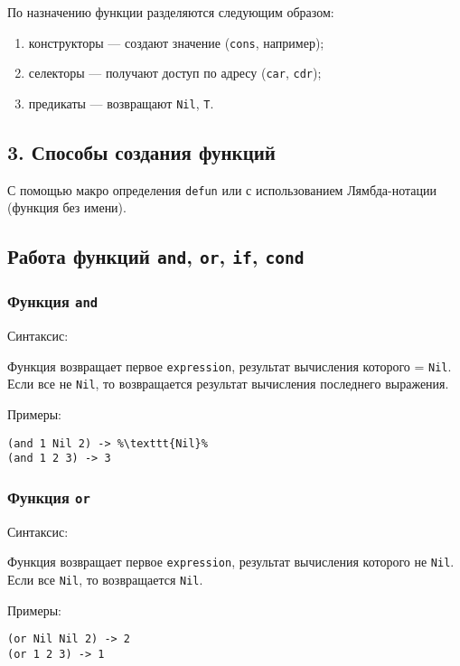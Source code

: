 По назначению функции разделяются следующим образом:
\begin{enumerate}
	\item конструкторы --- создают значение (\texttt{cons}, например);
	\item селекторы --- получают доступ по адресу (\texttt{car}, \texttt{cdr});
	\item предикаты --- возвращают \texttt{Nil}, \texttt{T}.
\end{enumerate}

\subsection*{3. Способы создания функций}

С помощью макро определения \texttt{defun} или с использованием Лямбда-нотации (функция без имени).

\subsection*{Работа функций \texttt{and}, \texttt{or}, \texttt{if}, \texttt{cond}}

\subsubsection*{Функция \texttt{and}}

Синтаксис: 

Функция возвращает первое \texttt{expression}, результат вычисления которого = \texttt{Nil}. Если все не \texttt{Nil}, то возвращается результат вычисления последнего выражения.

Примеры:
\begin{lstlisting}[style={scheme}]
(and 1 Nil 2) -> %\texttt{Nil}%
(and 1 2 3) -> 3
\end{lstlisting}

\subsubsection*{Функция \texttt{or}}

Синтаксис: 

Функция возвращает первое \texttt{expression}, результат вычисления которого не \texttt{Nil}. Если все \texttt{Nil}, то возвращается \texttt{Nil}.

Примеры:
\begin{lstlisting}[style={scheme}]
(or Nil Nil 2) -> 2
(or 1 2 3) -> 1
\end{lstlisting}


